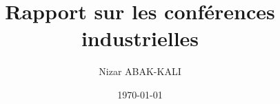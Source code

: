 \documentclass[a4paper,12pt,final]{article}
\title{Rapport sur les conférences industrielles}
\author{Nizar ABAK-KALI}
\date{\today}
\begin{document}


\cleardoublepage %

\tableofcontents
\sloppy

\cleardoublepage 



\cleardoublepage



\cleardoublepage



\cleardoublepage



\cleardoublepage



\cleardoublepage



\cleardoublepage



\cleardoublepage



\cleardoublepage



\cleardoublepage



\cleardoublepage




\cleardoublepage
\end{document}
